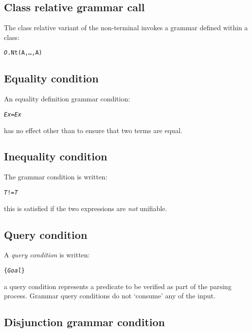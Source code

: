 \subsection{Class relative grammar call}
\label{grammar:dot}
The class relative variant of the non-terminal invokes a grammar defined within a class:
\begin{alltt}
\emph{O}.Nt(A,\ldots,A\subn)
\end{alltt}

\subsection{Equality condition}
\label{grammar:equality}

An equality definition grammar condition:
\begin{alltt}
\emph{Ex} = \emph{Ex}
\end{alltt}
has no effect other than to ensure that two terms are equal.

\subsection{Inequality condition}
\label{grammar:notequality}

The \q{!=} grammar condition is written:
\begin{alltt}
\emph{T} != \emph{T}
\end{alltt}
this is satisfied if the two expressions are \emph{not} unifiable.

\subsection{Query condition}
\label{grammar:goal}

A \emph{query condition} is written:
\begin{alltt}
\{ \emph{Goal} \}
\end{alltt}
a query condition represents a predicate to be verified as part of the parsing process. Grammar query conditions do not `consume' any of the input.

\subsection{Disjunction grammar condition}
\label{grammar:disjunction}

